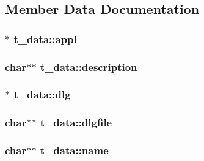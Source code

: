 \subsection{\-Member \-Data \-Documentation}
\hypertarget{structt__data_a3b0673ce6ff70cdc856cac28f0de63c6}{
\subsubsection[{appl}]{$\ast$ {\bf t\-\_\-data\-::appl}}}\label{structt__data_a3b0673ce6ff70cdc856cac28f0de63c6}
\hypertarget{structt__data_ae84609c05b25b39fdb01e01053210fd5}{
\subsubsection[{description}]{\setlength{\rightskip}{0pt plus 5cm}char$\ast$$\ast$ {\bf t\-\_\-data\-::description}}}\label{structt__data_ae84609c05b25b39fdb01e01053210fd5}
\hypertarget{structt__data_a4ecdb1d6b2c8eaccbce579994240a2e1}{
\subsubsection[{dlg}]{$\ast$ {\bf t\-\_\-data\-::dlg}}}\label{structt__data_a4ecdb1d6b2c8eaccbce579994240a2e1}
\hypertarget{structt__data_a04baabe685184d0f295cab4cd866df79}{
\subsubsection[{dlgfile}]{\setlength{\rightskip}{0pt plus 5cm}char$\ast$$\ast$ {\bf t\-\_\-data\-::dlgfile}}}\label{structt__data_a04baabe685184d0f295cab4cd866df79}
\hypertarget{structt__data_a77c84745a9370ffb8704ac4ec2ac8062}{
\subsubsection[{name}]{\setlength{\rightskip}{0pt plus 5cm}char$\ast$$\ast$ {\bf t\-\_\-data\-::name}}}\label{structt__data_a77c84745a9370ffb8704ac4ec2ac8062}
